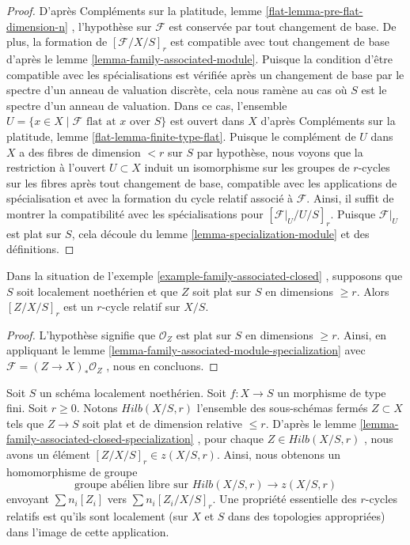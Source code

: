 \begin{proof} 
D'après Compléments sur la platitude, lemme \ref{flat-lemma-pre-flat-dimension-n} 
, l'hypothèse sur  $\mathcal{F}$ est conservée par tout changement de base. 
De plus, la formation de  $[\mathcal{F}/X/S]_r$ est compatible avec tout changement
 de base d'après le lemme  \ref{lemma-family-associated-module}. 
Puisque la condition d'être compatible avec les spécialisations est
 vérifiée après un changement de base par le spectre d'un anneau de valuation 
discrète, cela nous ramène au cas où  $S$  est le spectre d'un anneau de valuation. 
Dans ce cas, l'ensemble  
$U = \{x \in X \mid \mathcal{F}\text{ flat at }x\text{ over }S\}$
  est ouvert dans  $X$  
d'après Compléments sur la platitude, lemme \ref{flat-lemma-finite-type-flat}. 
Puisque le complément de  $U$  dans $X$  a des fibres de dimension  $< r$  sur  
$S$  par hypothèse, nous voyons que la restriction à l'ouvert  
$U \subset X$ induit un isomorphisme sur les groupes de  $r$-cycles 
sur les fibres après tout changement de base, compatible avec les applications de
 spécialisation et avec la formation du cycle relatif associé à  $\mathcal{F}$.
 Ainsi, il suffit de montrer la compatibilité avec les
 spécialisations pour  $[\mathcal{F}|_U / U /S]_r$.
 Puisque $\mathcal{F}|_U$  est plat sur  $S$, cela découle du 
lemme  \ref{lemma-specialization-module}  et des définitions. 
\end{proof} 

\begin{lemma} 
\label{lemma-family-associated-closed-specialization} 
Dans la situation de l'exemple  \ref{example-family-associated-closed} , supposons
 que $S$ soit localement noethérien et que  $Z$  soit plat sur  $S$  en dimensions 
$\geq r$. Alors  $[Z/X/S]_r$  est un  $r$-cycle relatif sur $X/S$. 
\end{lemma} 

\begin{proof}
 L'hypothèse signifie que  $\mathcal{O}_Z$  est plat sur  $S$  
en dimensions $\geq r$. Ainsi, en appliquant 
le lemme  \ref{lemma-family-associated-module-specialization}  
avec  $\mathcal{F} = (Z \to X)_*\mathcal{O}_Z$ , nous en concluons. 
\end{proof} 

\noindent
 Soit  $S$  un schéma localement noethérien. Soit  $f : X \to S$  un morphisme
 de type fini. Soit  $r \geq 0$. Notons  $Hilb(X/S, r)$
  l'ensemble des sous-schémas fermés  $Z \subset X$  tels que  $Z \to S$  soit 
plat et de dimension relative $\leq r$. D'après
 le lemme  \ref{lemma-family-associated-closed-specialization} , pour chaque  
$Z \in Hilb(X/S, r)$ , nous avons un élément  $[Z/X/S]_r \in z(X/S, r)$.
 Ainsi, nous obtenons un homomorphisme de groupe 
\begin{equation} 
\label{equation-cycle-classes} 
\text{groupe abélien libre sur }Hilb(X/S, r) \longrightarrow z(X/S, r) 
\end{equation} 
envoyant  $\sum n_i[Z_i]$  vers  $\sum n_i[Z_i/X/S]_r$.
 Une propriété essentielle des $r$-cycles relatifs est qu'ils sont localement 
(sur  $X$  et $S$  dans des topologies appropriées) dans l'image de cette application. 

